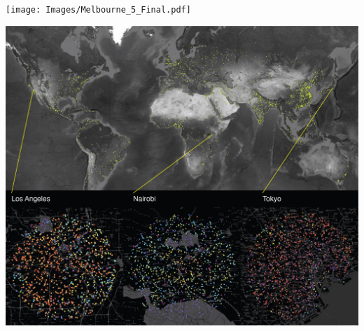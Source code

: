 \documentclass{nature}
\makeatletter
\renewenvironment*{figure}{\@float{figure}}{\end@float}
\makeatother
\begin{document}
\begin{figure}
\centering    
\texttt{[image: Images/Melbourne\_5\_Final.pdf]}  
\caption{\bf  Map of Melbourne, Australia with 24,027 individual map segments classified and colour coded. Insert image on bottom left shows colour coding scheme for SOM x,y locations of Figure \ref{fig:somresults}. Note, the central business district (CBD) region shows additional points due to inclusion of the 1000 circular sampling procedure in addition to the 23,027 locations sampled at 400m resolution. }    
 \label{fig:mel23000}  
\end{figure} 


\begin{figure}
\centering    
\includegraphics[scale=0.85]{Images/World-01.jpg}  
\caption{\bf  1667 world cities (top) sampled with inserts showing detail of (left) San Francisco, (centre) Nairobi, and (right) Tokyo. City detail maps use the same SOM x,y location colour scheme as Figure \ref{fig:mel23000}.}    
 \label{fig:world}  
\end{figure} 

\end{document}

